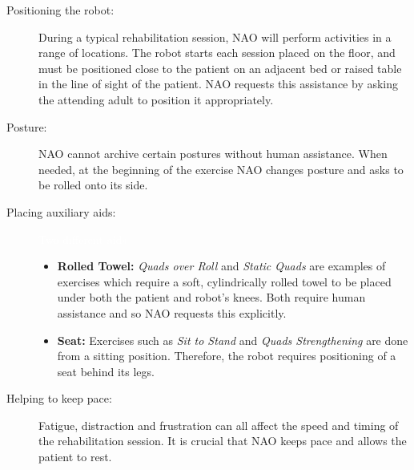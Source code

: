 \documentclass[a0paper, portrait]{tikzposter}
\begin{document}
\begin{columns}
{    \begin{description}  
    \item [Positioning the robot:] 
        During a typical rehabilitation session, NAO will perform activities in a range of locations. The robot starts each
        session placed on the floor, and must be positioned close to the patient on an adjacent bed or raised table in the line
        of sight of the patient.
        NAO requests this assistance by asking the attending adult to position it appropriately.
    \item [Posture:]
        NAO cannot archive certain postures without human assistance. When needed,
        at the beginning of the exercise NAO changes posture and asks to be rolled onto its side.
    \item [Placing auxiliary aids:] \textcolor{white}{Two different aids}
        \begin{itemize}  
        \item \textbf{Rolled Towel:} \emph{Quads over Roll} and \emph{Static Quads} 
            are examples of exercises which require a soft, cylindrically rolled towel
            to be placed under both the patient and robot's knees.
            Both require human assistance and so NAO requests this explicitly.
        \item \textbf{Seat:}
        Exercises such as \emph{Sit to Stand} and \emph{Quads Strengthening}
        are done from a sitting position. Therefore, the robot requires positioning of a seat behind its legs.
        \end{itemize}
        
    \item [Helping to keep pace:] 
        Fatigue, distraction and frustration can all affect the speed and timing of the rehabilitation session. 
        It is crucial that NAO keeps pace and allows the patient to rest. %
    \end{description}

 }
 \end{columns}
\end{document}
